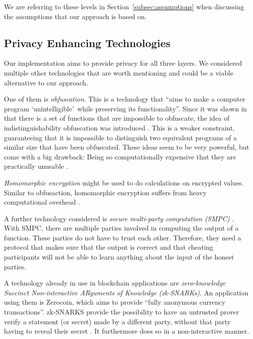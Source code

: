 \documentclass[runningheads]{llncs}
\newcommand{\refsec}[1]{Section~\ref{#1}}
\newcommand{\quotel}{``}
\newcommand{\quoter}{''}
\begin{document}
We are referring to these levels in \refsec{subsec:assumptions} when discussing the assumptions that our approach is based on.






\subsection{Privacy Enhancing Technologies} \label{subsec:technologies}

Our implementation aims to provide privacy for all three layers. We considered multiple other technologies that are  worth mentioning and could be a viable alternative to our approach. 

One of them is \textit{obfuscation}. This is a technology that \quotel aims to make a computer program `unintelligible'\ while preserving its functionality\quoter  \cite{garg2016candidate}. Since it was shown in that there is a set of functions that are impossible to obfuscate, the idea of indistinguishability obfuscation  was introduced \cite{barak2001possibility,barak2012possibility}. This is a weaker constraint, guaranteeing that it is impossible to distinguish two equivalent programs of a similar size that have been obfuscated. These ideas seem to be very powerful, but come with a big drawback: Being so computationally expensive that they are practically unusable \cite{banescu2015idea}.

\textit{Homomorphic encryption} might be used to do calculations on encrypted values. Similar to obfusaction, homomorphic encryption suffers from heavy computational overhead \cite{gentry2010computing}.


A further technology considered is \textit{secure multi-party computation (SMPC)} \cite{orlandi2011multiparty}. With SMPC, there are multiple parties involved in computing the output of a function. These parties do not have to trust each other. Therefore, they need a protocol that makes sure that the output is correct and that cheating participants will not be able to learn anything about the input of the honest parties. 


A technology already in use in blockchain applications are \textit{zero-knowledge Succinct Non-interactive ARguments of Knowledge (zk-SNARKs)}. An application using them is Zerocoin, which aims to provide  \quotel fully anonymous currency transactions\quoter  \cite{miers2013zerocoin}. zk-SNARKS provide the possibility to have an untrusted prover verify a statement (or secret) made by a different party, without that party having to reveal their secret \cite{ben2013snarks}. It furthermore does so in a non-interactive manner. 
\end{document}

